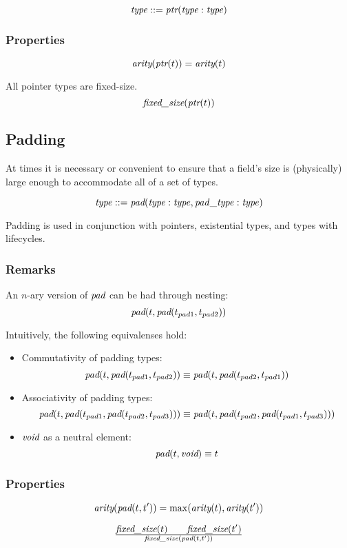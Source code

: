 \documentclass[a4paper]{report}
\newcommand\arity{{\ensuremath\textit{arity}}}
\newcommand\fixedsize{{\ensuremath\textit{fixed\_size}}}
\newcommand\tyPtr{{\ensuremath\textit{ptr}}}
\newcommand\tyPad{{\ensuremath\textit{pad}}}
\newcommand\tyVoid{{\ensuremath\textit{void}}}
\begin{document}
$$\it type ::= \tyPtr(type : type)$$

\subsubsection*{Properties}
$$ \arity(\tyPtr(t)) = \arity(t)$$

All pointer types are fixed-size.
$$\fixedsize(\tyPtr(t))$$

\subsection{Padding}
At times it is necessary or convenient to ensure that a field's size is
(physically) large enough to accommodate all of a set of types.

$$\it type ::= \tyPad(type : type, pad\_type : type)$$

Padding is used in conjunction with pointers, existential types,
and types with lifecycles.

\subsubsection*{Remarks}
An $n$-ary version of $\tyPad$ can be had through nesting:
$$\tyPad(t, \tyPad(t_{pad1}, t_{pad2}))$$

\noindent
Intuitively, the following equivalenses hold:

\begin{itemize}
\item Commutativity of padding types:
$$\tyPad(t, \tyPad(t_{pad1}, t_{pad2})) \equiv
  \tyPad(t, \tyPad(t_{pad2}, t_{pad1}))$$

\item Associativity of padding types:
$$\tyPad(t, \tyPad(t_{pad1}, \tyPad(t_{pad2}, t_{pad3}))) \equiv
\tyPad(t, \tyPad(t_{pad2}, \tyPad(t_{pad1}, t_{pad3})))$$

\item $\tyVoid$ as a neutral element:
$$\tyPad(t, \tyVoid) \equiv t$$

\end{itemize}

\subsubsection*{Properties}
$$ \arity(\tyPad(t, t')) = \max(\arity(t), \arity(t'))$$


$${\fixedsize(t) \qquad \fixedsize(t')}
 \over
\fixedsize(\tyPad(t, t'))$$
\end{document}
